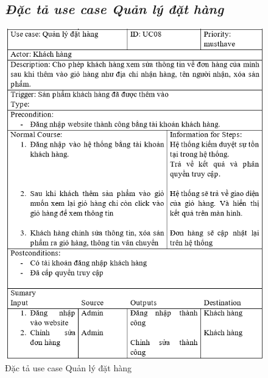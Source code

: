 \documentclass{report}
\begin{document}
\begin{figure}[htp]
    \subsection{\textit{Đặc tả use case Quản lý đặt hàng}}
    \centering
    \includegraphics[scale = 1]{image/UC08.PNG}
    \caption{Đặc tả use case Quản lý đặt hàng}
\end{figure}
\end{document}
